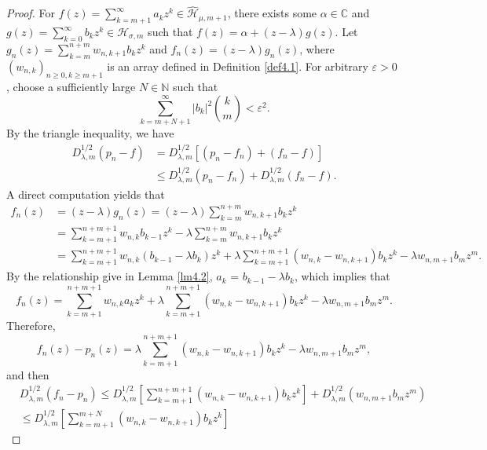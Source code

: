 \documentclass[12pt,reqno]{amsart}
\begin{document}
\begin{proof}
For \(  f(z)=\sum\limits_{k = m+1}^\infty  {{a_k}{z^k}} \in \widehat{\mathcal{H}}_{\mu, m+1} \), there exists some \( \alpha \in \mathbb{C}\) and \( g(z) = \sum\limits_{k = 0}^\infty  {{b_k}{z^k}} \in {\mathcal{H}_{\sigma ,m}} \) such that \( f(z) = \alpha + (z - \lambda)g(z)\). Let \( {g_n}(z) = \sum\limits_{k = m}^{n + m} {{w_{n,k + 1}}{b_k}{z^k}}\) and \({f_n}(z) = (z - \lambda ){g_n}(z)\), where \( (w_{n,k})_{n \geq 0, k \geq m+1} \) is an array defined in Definition \ref{def4.1}. For arbitrary \( \varepsilon > 0 \) , choose a sufficiently large \( N \in \mathbb{N} \) such that
\[
\sum_{k = m + N +1}^{\infty} |b_k|^2 \binom{k}{m} < \varepsilon^2. \tag{3.7}
\]
By the triangle inequality, we have
\begin{align*}
D_{\lambda ,m}^{1/2}(p_n - f)
&= D_{\lambda ,m}^{1/2}\left[(p_n - f_n) + (f_n - f)\right] \\
&\le D_{\lambda ,m}^{1/2}(p_n - f_n) + D_{\lambda ,m}^{1/2}(f_n - f).
\end{align*}
A direct computation yields that
\begin{align*}
f_n(z)
&= (z - \lambda) g_n(z) = (z - \lambda) \sum_{k = m}^{n + m} w_{n,k + 1} b_k z^k \\
&= \sum_{k = m+1}^{n + m + 1} w_{n,k} b_{k - 1} z^k
- \lambda \sum_{k = m}^{n + m} w_{n,k + 1} b_k z^k \\
&= \sum_{k = m+1}^{n + m + 1} w_{n,k} (b_{k - 1} - \lambda b_k) z^k
+ \lambda \sum_{k = m+1}^{n + m + 1} (w_{n,k} - w_{n,k + 1}) b_k z^k - \lambda {w_{n,m+1}}{b_{m}}{z^{m}}.
\end{align*}
By the relationship give in Lemma \ref{lm4.2}, \( a_k \) = \( b_{k-1} - \lambda b_k \), which implies that
\[
f_n(z) = \sum_{k = m + 1}^{n + m + 1} w_{n,k} a_k z^k
+ \lambda \sum_{k = m + 1}^{n + m + 1} (w_{n,k} - w_{n,k + 1}) b_k z^k - \lambda {w_{n,m+1}}{b_{m}}{z^{m}}.
\]
Therefore,
\[
f_n(z) - p_n(z) = \lambda \sum_{k = m + 1}^{n + m + 1} (w_{n,k} - w_{n,k + 1}) b_k z^k - \lambda {w_{n,m+1}}{b_{m}}{z^{m}},
\]
and then
\begin{align*}
&D_{\lambda ,m}^{1/2}(f_n - p_n)
\le D_{\lambda ,m}^{1/2} \left[ \sum_{k = m + 1}^{n + m + 1} (w_{n,k} - w_{n,k + 1}) b_k z^k \right] + D_{\lambda ,m}^{1/2}({w_{n,m+1}}{b_{m}}{z^{m}})\\
&\le D_{\lambda ,m}^{1/2} \left[ \sum_{k = m + 1}^{m + N} (w_{n,k} - w_{n,k + 1}) b_k z^k \right]

\end{align*}
\end{proof}
\end{document}
